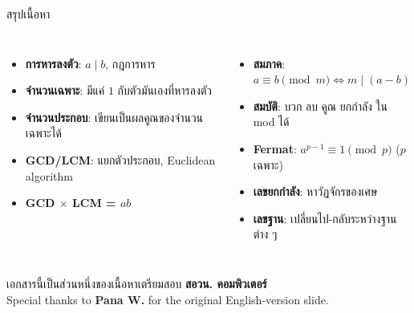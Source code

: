 \documentclass[11pt, aspectratio=169]{beamer}
\begin{document}
\begin{frame}{สรุปเนื้อหา}
  \begin{explanation}[สิ่งที่ได้เรียนรู้]
    \begin{columns}[T]
        \begin{itemize}
          \item \textbf{การหารลงตัว}: $a \mid b$, กฎการหาร
          \item \textbf{จำนวนเฉพาะ}: มีแค่ $1$ กับตัวมันเองที่หารลงตัว
          \item \textbf{จำนวนประกอบ}: เขียนเป็นผลคูณของจำนวนเฉพาะได้
          \item \textbf{GCD/LCM}: แยกตัวประกอบ, Euclidean algorithm
          \item \textbf{GCD $\times$ LCM = $ab$}
        \end{itemize}
        \begin{itemize}
          \item \textbf{สมภาค}: $a \equiv b \pmod{m} \iff m \mid (a-b)$
          \item \textbf{สมบัติ}: บวก ลบ คูณ ยกกำลัง ใน mod ได้
          \item \textbf{Fermat}: $a^{p-1} \equiv 1 \pmod{p}$ ($p$ เฉพาะ)
          \item \textbf{เลขยกกำลัง}: หาวัฏจักรของเศษ
          \item \textbf{เลขฐาน}: เปลี่ยนไป-กลับระหว่างฐานต่าง ๆ
        \end{itemize}
    \end{columns}
  \end{explanation}
  \begin{center}
    \large เอกสารนี้เป็นส่วนหนึ่งของเนื้อหาเตรียมสอบ \textbf{สอวน. คอมพิวเตอร์}\\
    Special thanks to \textbf{Pana W.} for the original English-version slide.
  \end{center}
\end{frame}
\end{document}
